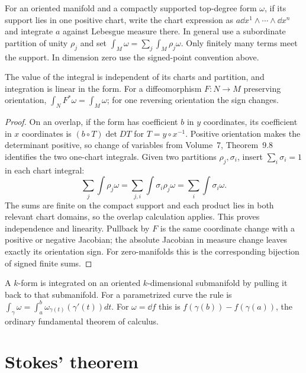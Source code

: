\begin{definition}
For an oriented manifold and a compactly supported top-degree form $\omega$, if its support lies in one positive chart, write the chart expression as $a\dd x^1\wedge\cdots\wedge\dd x^n$ and integrate $a$ against Lebesgue measure there. In general use a subordinate partition of unity $\rho_j$ and set $\int_M\omega=\sum_j\int_M\rho_j\omega$. Only finitely many terms meet the support. In dimension zero use the signed-point convention above.
\end{definition}

\begin{proposition}\label{prop:intwelldef}
The value of the integral is independent of its charts and partition, and integration is linear in the form. For a diffeomorphism $F:N\to M$ preserving orientation, $\int_NF^*\omega=\int_M\omega$; for one reversing orientation the sign changes.
\end{proposition}

\begin{proof}
On an overlap, if the form has coefficient $b$ in $y$ coordinates, its coefficient in $x$ coordinates is $(b\circ T)\det DT$ for $T=y\circ x^{-1}$. Positive orientation makes the determinant positive, so change of variables from Volume~7, Theorem~9.8 identifies the two one-chart integrals. Given two partitions $\rho_j,\sigma_i$, insert $\sum_i\sigma_i=1$ in each chart integral:
\[
\sum_j\int\rho_j\omega=\sum_{j,i}\int\sigma_i\rho_j\omega
=\sum_i\int\sigma_i\omega.
\]
The sums are finite on the compact support and each product lies in both relevant chart domains, so the overlap calculation applies. This proves independence and linearity. Pullback by $F$ is the same coordinate change with a positive or negative Jacobian; the absolute Jacobian in measure change leaves exactly its orientation sign. For zero-manifolds this is the corresponding bijection of signed finite sums.
\end{proof}

A $k$-form is integrated on an oriented $k$-dimensional submanifold by pulling it back to that submanifold. For a parametrized curve the rule is
$\int_\gamma\omega=\int_a^b\omega_{\gamma(t)}(\gamma'(t))dt$.
For $\omega=\dd f$ this is $f(\gamma(b))-f(\gamma(a))$, the ordinary fundamental theorem of calculus.

\section{Stokes' theorem}

